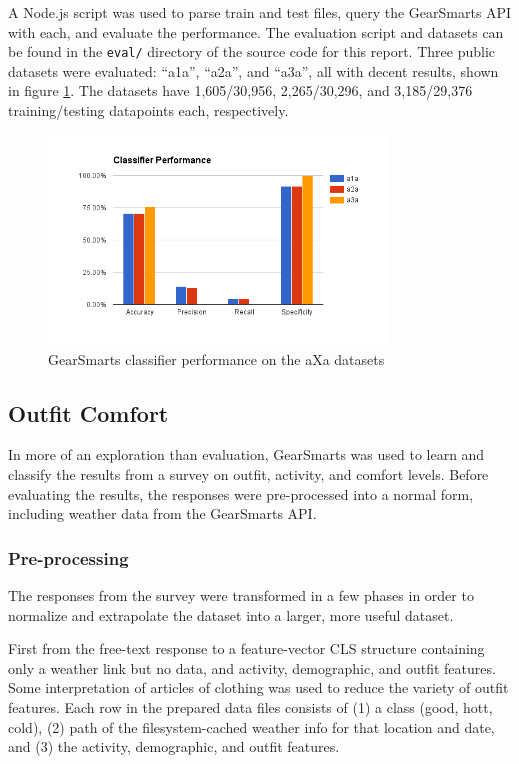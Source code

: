 A Node.js script was used to parse train and test files, query the GearSmarts API with each, and evaluate the performance.
The evaluation script and datasets can be found in the \texttt{eval/} directory of the source code for this report.
Three public datasets were evaluated: ``a1a'', ``a2a'', and ``a3a'', all with decent results, shown in figure \ref{fig:aXa}.
The datasets have 1,605/30,956, 2,265/30,296, and 3,185/29,376 training/testing datapoints each, respectively.

\begin{figure}[ht!]
    \centering
    \includegraphics[width=90mm]{img/aXa.png}
    \caption{GearSmarts classifier performance on the aXa datasets}
    \label{fig:aXa}
\end{figure}



\subsection{Outfit Comfort}
In more of an exploration than evaluation, GearSmarts was used to learn and classify the results from a survey on
outfit, activity, and comfort levels. Before evaluating the results, the responses were pre-processed into a normal
form, including weather data from the GearSmarts API.

\subsubsection{Pre-processing}
\label{subsection:preprocessing}
The responses from the survey were transformed in a few phases in order to normalize and extrapolate the dataset into a
larger, more useful dataset.

First from the free-text response to a feature-vector CLS structure
containing only a weather link but no data, and activity, demographic, and outfit features. Some interpretation of articles of clothing
was used to reduce the variety of outfit features. Each row in the prepared data
files consists of (1) a class (good, hott, cold), (2) path of the filesystem-cached weather info for that location and
date, and (3) the activity, demographic, and outfit features.

